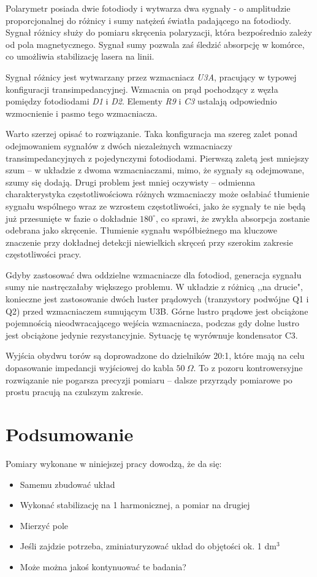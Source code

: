 \documentclass[a4paper,10pt]{article}
\begin{document}
Polarymetr posiada dwie fotodiody i wytwarza dwa sygnały - o amplitudzie proporcjonalnej do różnicy i sumy natężeń światła padającego na fotodiody.
Sygnał różnicy służy do pomiaru skręcenia polaryzacji, która bezpośrednio zależy od pola magnetycznego.  Sygnał sumy pozwala zaś śledzić absorpcję w komórce, co umożliwia stabilizację lasera na linii.

Sygnał różnicy jest wytwarzany przez wzmacniacz \textit{U3A}, pracujący w typowej konfiguracji transimpedancyjnej. Wzmacnia on prąd pochodzący z węzła pomiędzy fotodiodami \textit{D1} i \textit{D2}.
Elementy \textit{R9} i \textit{C3} ustalają odpowiednio wzmocnienie i pasmo tego wzmacniacza.

Warto szerzej opisać to rozwiązanie. Taka konfiguracja ma szereg zalet ponad odejmowaniem sygnałów z dwóch niezależnych wzmacniaczy transimpedancyjnych z pojedynczymi fotodiodami.
Pierwszą zaletą jest mniejszy szum -- w układzie z dwoma wzmacniaczami, mimo, że sygnały są odejmowane, szumy się dodają. Drugi problem jest mniej oczywisty -- odmienna charakterystyka częstotliwościowa różnych wzmacniaczy może osłabiać tłumienie sygnału wspólnego wraz ze wzrostem częstotliwości, jako że sygnały te nie będą już przesunięte w fazie o dokładnie $180^{\circ}$, co sprawi, że zwykła absorpcja zostanie odebrana jako skręcenie. Tłumienie sygnału współbieżnego ma kluczowe znaczenie przy dokładnej detekcji niewielkich skręceń przy szerokim zakresie częstotliwości pracy.

Gdyby zastosować dwa oddzielne wzmacniacze dla fotodiod, generacja sygnału sumy nie nastręczałaby większego problemu. W układzie z różnicą ,,na drucie", konieczne jest zastosowanie dwóch luster prądowych (tranzystory podwójne Q1 i Q2) przed wzmacniaczem sumującym U3B. Górne lustro prądowe jest obciążone pojemnością nieodwracającego wejścia wzmacniacza, podczas gdy dolne lustro jest obciążone jedynie rezystancyjnie. Sytuację tę wyrównuje kondensator C3. 

Wyjścia obydwu torów są doprowadzone do dzielników 20:1, które mają na celu dopasowanie impedancji wyjściowej do kabla $50~\Omega$. To z pozoru kontrowersyjne rozwiązanie nie pogarsza precyzji pomiaru -- dalsze przyrządy pomiarowe po prostu pracują na czulszym zakresie.


\chapter{Podsumowanie}

Pomiary wykonane w niniejszej pracy dowodzą, że da się:
\begin{itemize}
\item Samemu zbudować układ
\item Wykonać stabilizację na 1 harmonicznej, a pomiar na drugiej
\item Mierzyć pole
\item Jeśli zajdzie potrzeba, zminiaturyzować układ do objętości ok. 1 dm${}^3$
\item Może można jakoś kontynuować te badania?
\end{itemize}
\end{document}
